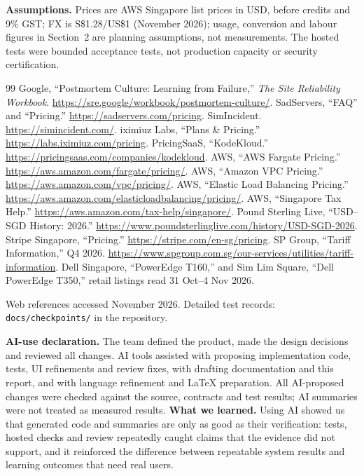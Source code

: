 \documentclass[11pt,a4paper]{article}
\begin{document}
\textbf{Assumptions.} Prices are AWS Singapore list prices in USD, before
credits and 9\% GST; FX is S\$1.28/US\$1 (November 2026); usage, conversion and labour figures in
Section~2 are planning assumptions, not measurements. The hosted tests were
bounded acceptance tests, not production capacity or security certification.

\begin{thebibliography}{99}
\footnotesize
\setlength{\itemsep}{0pt}
 Google, ``Postmortem Culture: Learning from Failure,'' \emph{The Site
Reliability Workbook}. \url{https://sre.google/workbook/postmortem-culture/}.
 SadServers, ``FAQ'' and ``Pricing.'' \url{https://sadservers.com/pricing}.
 SimIncident. \url{https://simincident.com/}.
 iximiuz Labs, ``Plans \& Pricing.'' \url{https://labs.iximiuz.com/pricing}.
 PricingSaaS, ``KodeKloud.'' \url{https://pricingsaas.com/companies/kodekloud}.
 AWS, ``AWS Fargate Pricing.'' \url{https://aws.amazon.com/fargate/pricing/}.
 AWS, ``Amazon VPC Pricing.'' \url{https://aws.amazon.com/vpc/pricing/}.
 AWS, ``Elastic Load Balancing Pricing.''
\url{https://aws.amazon.com/elasticloadbalancing/pricing/}.
 AWS, ``Singapore Tax Help.'' \url{https://aws.amazon.com/tax-help/singapore/}.
 Pound Sterling Live, ``USD--SGD History: 2026.'' \url{https://www.poundsterlinglive.com/history/USD-SGD-2026}.
 Stripe Singapore, ``Pricing.'' \url{https://stripe.com/en-sg/pricing}.
 SP Group, ``Tariff Information,'' Q4 2026.
\url{https://www.spgroup.com.sg/our-services/utilities/tariff-information}.
 Dell Singapore, ``PowerEdge T160,'' and Sim Lim Square,
``Dell PowerEdge T350,'' retail listings read 31 Oct--4 Nov 2026.
\end{thebibliography}
{\footnotesize Web references accessed November 2026. Detailed test records:
\texttt{docs/checkpoints/} in the repository.\par}

\textbf{AI-use declaration.} The team defined the product, made the design
decisions and reviewed all changes. AI tools assisted with proposing
implementation code, tests, UI refinements and review fixes, with drafting
documentation and this report, and with language refinement and LaTeX
preparation. All AI-proposed changes were checked against the source, contracts
and test results; AI summaries were not treated as measured results.
\textbf{What we learned.} Using AI showed us that generated code and summaries
are only as good as their verification: tests, hosted checks and review
repeatedly caught claims that the evidence did not support, and it reinforced
the difference between repeatable system results and learning outcomes that
need real users.
\end{document}
